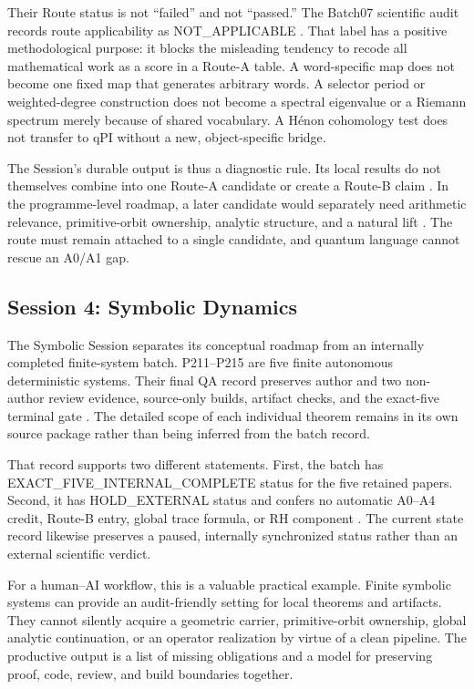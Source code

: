 Their Route status is not ``failed'' and not ``passed.'' The Batch07 scientific audit records route applicability as NOT\_APPLICABLE . That label has a positive methodological purpose: it blocks the misleading tendency to recode all mathematical work as a score in a Route-A table. A word-specific map does not become one fixed map that generates arbitrary words. A selector period or weighted-degree construction does not become a spectral eigenvalue or a Riemann spectrum merely because of shared vocabulary. A Hénon cohomology test does not transfer to qPI without a new, object-specific bridge.

The Session's durable output is thus a diagnostic rule. Its local results do not themselves combine into one Route-A candidate or create a Route-B claim . In the programme-level roadmap, a later candidate would separately need arithmetic relevance, primitive-orbit ownership, analytic structure, and a natural lift . The route must remain attached to a single candidate, and quantum language cannot rescue an A0/A1 gap.

\hypertarget{session-4-symbolic-dynamics}{%
\subsection{Session 4: Symbolic Dynamics}\label{session-4-symbolic-dynamics}}

The Symbolic Session separates its conceptual roadmap from an internally completed finite-system batch. P211--P215 are five finite autonomous deterministic systems. Their final QA record preserves author and two non-author review evidence, source-only builds, artifact checks, and the exact-five terminal gate . The detailed scope of each individual theorem remains in its own source package rather than being inferred from the batch record.

That record supports two different statements. First, the batch has EXACT\_FIVE\_INTERNAL\_COMPLETE status for the five retained papers. Second, it has HOLD\_EXTERNAL status and confers no automatic A0--A4 credit, Route-B entry, global trace formula, or RH component   . The current state record likewise preserves a paused, internally synchronized status rather than an external scientific verdict.

For a human--AI workflow, this is a valuable practical example. Finite symbolic systems can provide an audit-friendly setting for local theorems and artifacts. They cannot silently acquire a geometric carrier, primitive-orbit ownership, global analytic continuation, or an operator realization by virtue of a clean pipeline. The productive output is a list of missing obligations and a model for preserving proof, code, review, and build boundaries together.


